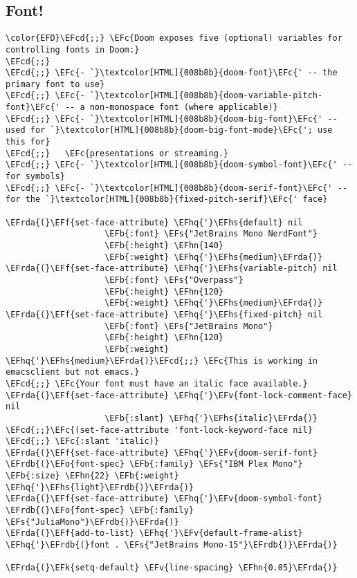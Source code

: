 \documentclass{article}
\newcommand{\EFc}[1]{\textcolor{EFc}{#1}} %
\newcommand{\EFcd}[1]{\textcolor{EFcd}{#1}} %
\newcommand{\EFs}[1]{\textcolor{EFs}{#1}} %
\newcommand{\EFk}[1]{\textcolor{EFk}{#1}} %
\newcommand{\EFb}[1]{\textcolor{EFb}{#1}} %
\newcommand{\EFf}[1]{\textcolor{EFf}{#1}} %
\newcommand{\EFv}[1]{\textcolor{EFv}{#1}} %
\newcommand{\EFo}[1]{\textcolor{EFo}{#1}} %
\newcommand{\EFhn}[1]{\textcolor{EFhn}{\textbf{#1}}} %
\newcommand{\EFhq}[1]{#1} %
\newcommand{\EFhs}[1]{\textcolor{EFhs}{#1}} %
\newcommand{\EFrda}[1]{\textcolor{EFrda}{#1}} %
\newcommand{\EFrdb}[1]{\textcolor{EFrdb}{#1}} %
\begin{document}
\subsection{Font!}
\label{sec:org1305701}
\begin{Code}
\begin{Verbatim}
\color{EFD}\EFcd{;;} \EFc{Doom exposes five (optional) variables for controlling fonts in Doom:}
\EFcd{;;}
\EFcd{;;} \EFc{- `}\textcolor[HTML]{008b8b}{doom-font}\EFc{' -- the primary font to use}
\EFcd{;;} \EFc{- `}\textcolor[HTML]{008b8b}{doom-variable-pitch-font}\EFc{' -- a non-monospace font (where applicable)}
\EFcd{;;} \EFc{- `}\textcolor[HTML]{008b8b}{doom-big-font}\EFc{' -- used for `}\textcolor[HTML]{008b8b}{doom-big-font-mode}\EFc{'; use this for}
\EFcd{;;}   \EFc{presentations or streaming.}
\EFcd{;;} \EFc{- `}\textcolor[HTML]{008b8b}{doom-symbol-font}\EFc{' -- for symbols}
\EFcd{;;} \EFc{- `}\textcolor[HTML]{008b8b}{doom-serif-font}\EFc{' -- for the `}\textcolor[HTML]{008b8b}{fixed-pitch-serif}\EFc{' face}

\EFrda{(}\EFf{set-face-attribute} \EFhq{'}\EFhs{default} nil
                    \EFb{:font} \EFs{"JetBrains Mono NerdFont"}
                    \EFb{:height} \EFhn{140}
                    \EFb{:weight} \EFhq{'}\EFhs{medium}\EFrda{)}
\EFrda{(}\EFf{set-face-attribute} \EFhq{'}\EFhs{variable-pitch} nil
                    \EFb{:font} \EFs{"Overpass"}
                    \EFb{:height} \EFhn{120}
                    \EFb{:weight} \EFhq{'}\EFhs{medium}\EFrda{)}
\EFrda{(}\EFf{set-face-attribute} \EFhq{'}\EFhs{fixed-pitch} nil
                    \EFb{:font} \EFs{"JetBrains Mono"}
                    \EFb{:height} \EFhn{120}
                    \EFb{:weight} \EFhq{'}\EFhs{medium}\EFrda{)}\EFcd{;;} \EFc{This is working in emacsclient but not emacs.}
\EFcd{;;} \EFc{Your font must have an italic face available.}
\EFrda{(}\EFf{set-face-attribute} \EFhq{'}\EFv{font-lock-comment-face} nil
                    \EFb{:slant} \EFhq{'}\EFhs{italic}\EFrda{)}
\EFcd{;;}\EFc{(set-face-attribute 'font-lock-keyword-face nil}
\EFcd{;;} \EFc{:slant 'italic)}
\EFrda{(}\EFf{set-face-attribute} \EFhq{'}\EFv{doom-serif-font} \EFrdb{(}\EFo{font-spec} \EFb{:family} \EFs{"IBM Plex Mono"} \EFb{:size} \EFhn{22} \EFb{:weight} \EFhq{'}\EFhs{light}\EFrdb{)}\EFrda{)}
\EFrda{(}\EFf{set-face-attribute} \EFhq{'}\EFv{doom-symbol-font} \EFrdb{(}\EFo{font-spec} \EFb{:family} \EFs{"JuliaMono"}\EFrdb{)}\EFrda{)}
\EFrda{(}\EFf{add-to-list} \EFhq{'}\EFv{default-frame-alist} \EFhq{'}\EFrdb{(}font . \EFs{"JetBrains Mono-15"}\EFrdb{)}\EFrda{)}

\EFrda{(}\EFk{setq-default} \EFv{line-spacing} \EFhn{0.05}\EFrda{)}
\end{Verbatim}
\end{Code}
\end{document}
